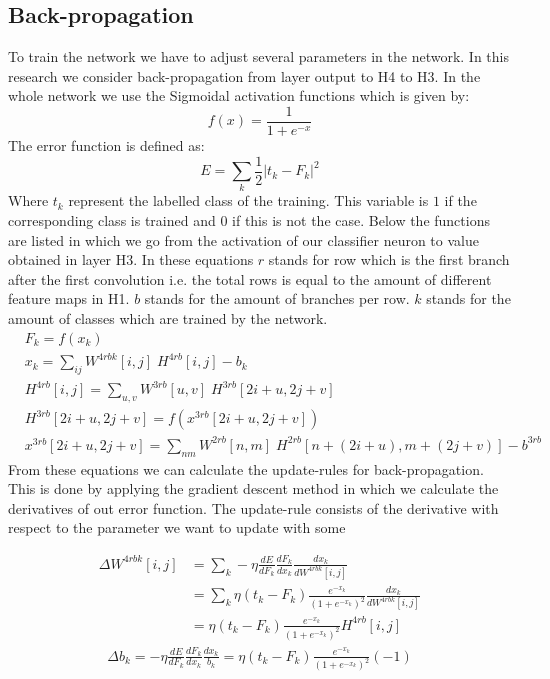 \documentclass[a4paper,onecolumn]{report}
\begin{document}
\subsection{Back-propagation}
To train the network we have to adjust several parameters in the network. In this research we consider back-propagation from layer output to H4 to H3. In the whole network we use the Sigmoidal activation functions which is given by:
\begin{equation}
f(x)=\frac{1}{1+e^{-x}} 
\end{equation}	
The error function is defined as:
\begin{equation}
E=\sum_{k} \frac{1}{2}|t_k-F_{k}|^{2}
\end{equation}
Where $t_k$ represent the labelled class of the training. This variable is $1$ if the corresponding class is trained and $0$ if this is not the case. Below the functions are listed in which we go from the activation of our classifier neuron to value obtained in layer H3. In these equations $r$ stands for row which is the first branch after the first convolution i.e. the total rows is equal to the amount of different feature maps in H1. $b$ stands for the amount of branches per row. $k$ stands for the amount of classes which are trained by the network.
\begin{equation}
\begin{split}
	&F_{k}= f( x_{k}) \\
	& x_{k}=\sum_{ij} W^{4rbk}[i,j] \; H^{4rb}[i,j] - b_{k} \\
	&H^{4rb}[i,j]= \sum_{u,v} W^{3rb}[u,v] \; H^{3rb} [2i+u,2j+v] \\
	&H^{3rb} [2i+u,2j+v]= f\left (x^{3rb}[2i+u,2j+v] \right) \\
	&x^{3rb}[2i+u,2j+v]=\sum_{nm} W^{2rb}[n,m] \; H^{2rb}[n+(2i+u),m+(2j+v)] -b^{3rb}
\end{split}
\end{equation}
From these equations we can calculate the update-rules for back-propagation. This is done by applying the gradient descent method in which we calculate the derivatives of out error function. The update-rule consists of the derivative with respect to the parameter we want to update with some 

\begin{equation}
\begin{split}
\Delta W^{4rbk}[i,j]&= \sum_{k} - \eta \frac{dE}{d F_{k}} \frac{dF_{k}}{dx_{k}} \frac{dx_{k}}{dW^{4rbk}[i,j]} \\
&= \sum_{k} \eta (t_{k}-F_{k})\frac{e^{-x_{k}}}{(1+e^{-x_{k}})^{2}} \frac{dx_{k}}{dW^{4rbk}[i,j]} \\
&= \eta (t_{k}-F_{k})\frac{e^{-x_{k}}}{(1+e^{-x_{k}})^{2}} H^{4rb}[i,j]
\end{split}
\end{equation}
\begin{equation}
\begin{split}
\Delta b_{k}= - \eta \frac{dE}{d F_{k}} \frac{dF_{k}}{dx_{k}} \frac{dx_{k}}{b_{k}}=\eta (t_{k}-F_{k})\frac{e^{-x_{k}}}{(1+e^{-x_{k}})^{2}} (-1)
\end{split}
\end{equation}
\end{document}
